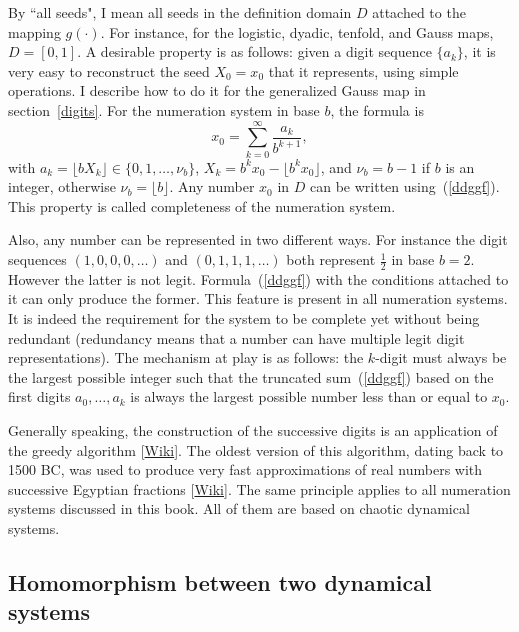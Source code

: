 \documentclass[oneside,10pt]{book}
\begin{document}
\noindent By ``all seeds", I mean all seeds in the definition domain $D$ attached to the mapping $g(\cdot)$. For instance, for the logistic, dyadic, tenfold, and Gauss maps, $D=[0, 1]$. A desirable property is as follows: given a digit sequence $\{a_k\}$, it is very easy to reconstruct the seed $X_0=x_0$ that it represents, using simple operations. I describe how to do it for the generalized Gauss map in section~\ref{digits}. For the numeration system in base $b$, the formula is
\begin{equation}
x_0 = \sum_{k=0}^\infty \frac{a_k}{b^{k+1}},\label{ddggf}
\end{equation}
with
$a_k = \lfloor bX_k\rfloor \in \{0, 1,\dots,  \nu_b\}$,  $X_k = b^k x_0 - \lfloor b^k x_0\rfloor$,
and  $\nu_b = b-1$ if $b$ is an integer, otherwise $\nu_b=\lfloor b\rfloor$.
Any number $x_0$ in $D$ can be written using~(\ref{ddggf}).
 This property is called \textcolor{index}{completeness} of the numeration system.

Also, any number can be represented in two different ways. For instance the digit sequences $(1, 0,0,0,\dots)$
 and $(0,1,1,1,\dots)$ both represent $\frac{1}{2}$ in base $b=2$. However the latter is not legit. Formula~(\ref{ddggf}) with the conditions attached to it can only produce the former. This feature is present in all numeration systems. It is indeed the  requirement
 for the system to be complete yet without being redundant
(\textcolor{index}{redundancy} means that a number can have multiple legit digit representations). The mechanism at play is as follows: the $k$-digit must always be the largest possible integer such that the truncated sum~(\ref{ddggf}) based on the first digits $a_0,\dots,a_k$ is always the largest possible number less than or equal to $x_0$.

Generally speaking, the construction of the successive digits is an application of the
 \textcolor{index}{greedy algorithm} [\href{https://en.wikipedia.org/wiki/Greedy_algorithm}{Wiki}]. The oldest version of this algorithm, dating back to 1500 BC, was used to produce very fast approximations of real numbers with
 successive \textcolor{index}{Egyptian fractions} [\href{https://en.wikipedia.org/wiki/Egyptian_fraction}{Wiki}].
The same principle applies to all numeration systems discussed in this book. All of them are based on chaotic dynamical systems.

\subsection{Homomorphism between two dynamical systems}\label{hohok}
\end{document}
